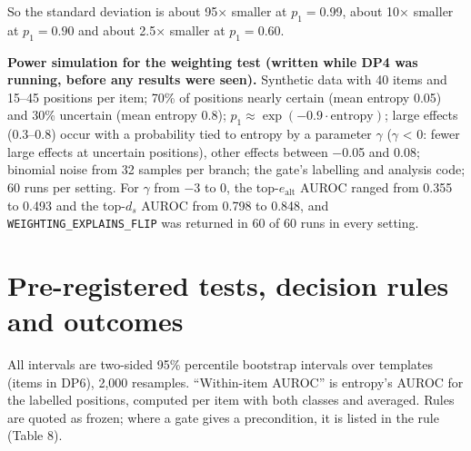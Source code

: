 \documentclass[
  10pt,
  a4paper,
]{article}
\begin{document}
So the standard deviation is about 95× smaller at \(p_1 = 0\).99, about 10× smaller at \(p_1 = 0.90\) and about 2.5× smaller at \(p_1 = 0.60\).

\textbf{Power simulation for the weighting test (written while DP4 was running, before any results were seen).} Synthetic data with 40 items and 15--45 positions per item; 70\% of positions nearly
certain (mean entropy 0.05) and 30\% uncertain (mean entropy 0.8); \(p_1 \approx \exp(-0.9\cdot\mathrm{entropy})\); large effects (0.3--0.8) occur with a probability tied to entropy by a parameter
\(\gamma\) (\(\gamma\) \textless{} 0: fewer large effects at uncertain positions), other effects between −0.05 and 0.08; binomial noise from 32 samples per branch; the gate's labelling and analysis
code; 60 runs per setting. For \(\gamma\) from −3 to 0, the top-\(e_{\mathrm{alt}}\) AUROC ranged from 0.355 to 0.493 and the top-\(d_{s}\) AUROC from 0.798 to 0.848, and
\texttt{WEIGHTING\_\allowbreak{}EXPLAINS\_\allowbreak{}FLIP} was returned in 60 of 60 runs in every setting.

\hypertarget{pre-registered-tests-decision-rules-and-outcomes}{%
\section{Pre-registered tests, decision rules and outcomes}\label{pre-registered-tests-decision-rules-and-outcomes}}

All intervals are two-sided 95\% percentile bootstrap intervals over templates (items in DP6), 2,000 resamples. ``Within-item AUROC'' is entropy's AUROC for the labelled positions, computed per item
with both classes and averaged. Rules are quoted as frozen; where a gate gives a precondition, it is listed in the rule (Table 8).
\end{document}
